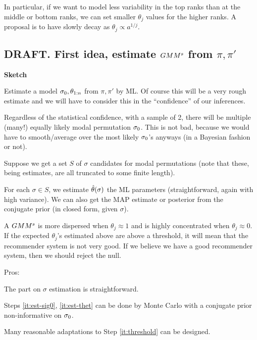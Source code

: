\documentclass[10pt]{article}
\begin{document}
In particular, if we want to model less variability in the top ranks than at the middle or bottom ranks, we can set smaller $\theta_j$ values for the higher ranks. A proposal \cite{} is to have slowly decay as $\theta_j\propto a^{1/j}$. 

\subsection{DRAFT. First idea, estimate $GMM^s$ from $\pi,\pi'$}
\label{sec:gmm-sig0}

{\bf Sketch}
\benum
\item \label{it:est-sig0}  Estimate a model $\sigma_0,\theta_{1:n}$ from $\pi,\pi'$ by ML. Of course this will be a very rough estimate and we will have to consider this in the ``confidence'' of our inferences.

  Regardless of the statistical confidence, with a sample of 2, there will be multiple (many!) equally likely modal permutation $\sigma_0$. This is not bad, because we would have to smooth/average over the most likely $\sigma_0$'s anyways (in a Bayesian fashion or not).

Suppose we get a set $S$ of $\sigma$ candidates for modal permutations (note that these, being estimates, are all truncated to some finite length).

\item \label{it:est-thet} For each $\sigma\in S$, we estimate $\hat{\theta}(\sigma)$ the ML parameters (straightforward, again with high variance). We can also get the MAP estimate or posterior from the conjugate prior (in closed form, given $\sigma$).

\item \label{it:threshold} A $GMM^s$ is more dispersed when $\theta_j\approx 1$ and is highly concentrated when $\theta_j\approx 0$. If the expected $\theta_j$'s estimated above are above a threshold, it will mean that the recommender system is not very good. If we believe we have a good recommender system, then we should reject the null.  
\eenum

Pros:
\bit
\item The part on $\sigma$ estimation is straightforward.
  \item Steps \ref{it:est-sig0}, \ref{it:est-thet} can be done by
  Monte Carlo \cite{ChenM} with a conjugate prior
  non-informative on $\sigma_0$.
\item Many   reasonable adaptations to Step \ref{it:threshold} can be
  designed.
  \eit
  
\end{document}
